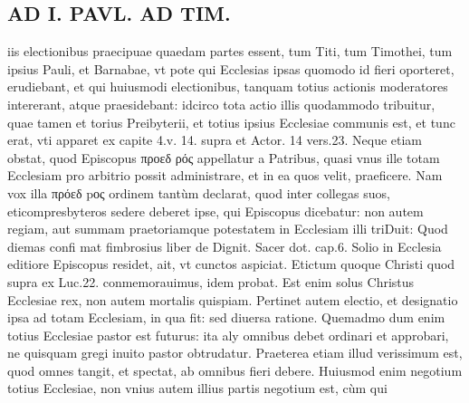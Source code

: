 \documentclass{article}
\begin{document}
\begin{pages}
\section*{AD I. PAVL. AD TIM. }
\marginpar{[ p.oi5 ]}\pstart iis electionibus praecipuae quaedam partes essent, tum Titi, tum Timothei, tum ipsius Pauli, et Barnabae, vt pote qui Ecclesias ipsas quomodo id fieri oporteret, erudiebant, et qui huiusmodi electionibus, tanquam totius actionis moderatores intererant, atque praesidebant: idcirco tota actio illis quodammodo tribuitur, quae tamen et torius Preibyterii, et totius ipsius Ecclesiae communis est, et tunc erat, vti apparet ex capite 4.v. 14. supra et Actor. 14 vers.23.  \pend\pstart Neque etiam obstat, quod Episcopus προεδ ρός appellatur a Patribus, quasi vnus ille totam Ecclesiam pro arbitrio possit administrare, et in ea quos velit, praeficere. Nam vox illa πρόεδ pος ordinem tantùm declarat, quod inter collegas suos, eticompresbyteros sedere deberet ipse, qui Episcopus dicebatur: non autem regiam, aut summam praetoriamque potestatem in Ecclesiam illi triDuit: Quod diemas confi mat fimbrosius liber  de Dignit. Sacer dot. cap.6. Solio in Ecclesia editiore Episcopus residet, ait, vt cunctos aspiciat. Etictum quoque Christi quod supra ex Luc.22. conmemorauimus, idem probat. Est enim solus Christus Ecclesiae rex, non autem mortalis quispiam.  \pend\pstart Pertinet autem electio, et designatio ipsa ad totam Ecclesiam, in qua fit: sed diuersa ratione. Quemadmo dum enim totius Ecclesiae pastor est futurus: ita aly omnibus debet ordinari et approbari, ne quisquam gregi inuito pastor obtrudatur. Praeterea etiam illud verissimum est, quod omnes tangit, et spectat, ab omnibus fieri debere. Huiusmod enim negotium totius Ecclesiae, non vnius autem illius partis negotium est, cùm qui  \pend

\end{pages}
\end{document}
